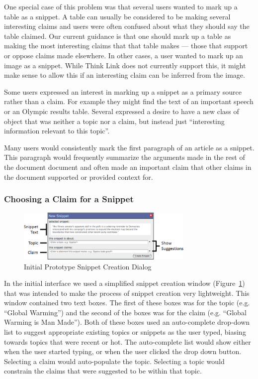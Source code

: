 \documentclass{chi2009}
\begin{document}
One special case of this problem was that several users wanted to mark up a table as a snippet. A table can usually be considered to be making several interesting claims and users were often confused about what they should say the table claimed. Our current guidance is that one should mark up a table as making the most interesting claims that that table makes --- those that support or oppose claims made elsewhere. In other cases, a user wanted to mark up an image as a snippet. While Think Link does not currently support this, it might make sense to allow this if an interesting claim can be inferred from the image.

Some users expressed an interest in marking up a snippet as a primary source rather than a claim. For example they might find the text of an important speech or an Olympic results table. Several expressed a desire to have a new class of object that was neither a topic nor a claim, but instead just ``interesting information relevant to this topic''.

Many users would consistently mark the first paragraph of an article as a snippet. This paragraph would frequently summarize the arguments made in the rest of the document document and often made an important claim that other claims in the document supported or provided context for. 


\subsubsection{Choosing a Claim for a Snippet}

\begin{figure}[t]
	\includegraphics[width=8.5cm]{../screenshots/oldsnipcreate_diagram.png}
	\caption{Initial Prototype Snippet Creation Dialog}
	\label{oldsnippetbox}
\end{figure}

In the initial interface we used a simplified snippet creation window (Figure~\ref{oldsnippetbox}) that was intended to make the process of snippet creation very lightweight. This window contained two text boxes. The first of these boxes was for the topic (e.g. ``Global Warming'') and the second of the boxes was for the claim (e.g. ``Global Warming is Man Made''). Both of these boxes used an auto-complete drop-down list to suggest appropriate existing topics or snippets as the user typed, 
biasing towards topics that were recent or hot. The auto-complete list would show either when the user started typing, or when the user clicked the drop down button. Selecting a claim would auto-populate the topic. Selecting a topic would constrain the claims that were suggested to be within that topic.
\end{document}
